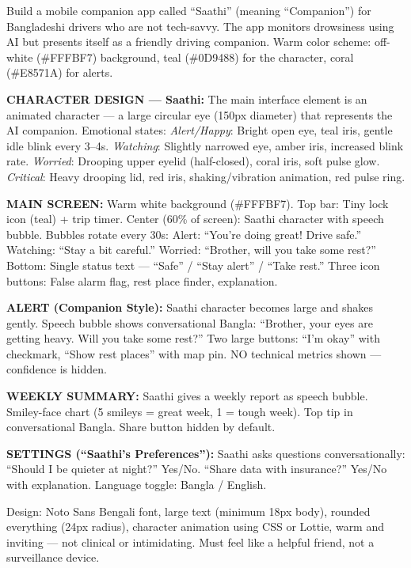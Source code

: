 \documentclass[sigconf]{acmart}
\begin{document}
\begin{promptbox}
Build a mobile companion app called ``Saathi'' (meaning ``Companion'') for Bangladeshi drivers who are not tech-savvy. The app monitors drowsiness using AI but presents itself as a friendly driving companion. Warm color scheme: off-white (\#FFFBF7) background, teal (\#0D9488) for the character, coral (\#E8571A) for alerts.

\textbf{CHARACTER DESIGN --- Saathi:} The main interface element is an animated character --- a large circular eye (150px diameter) that represents the AI companion. Emotional states: \textit{Alert/Happy}: Bright open eye, teal iris, gentle idle blink every 3--4s. \textit{Watching}: Slightly narrowed eye, amber iris, increased blink rate. \textit{Worried}: Drooping upper eyelid (half-closed), coral iris, soft pulse glow. \textit{Critical}: Heavy drooping lid, red iris, shaking/vibration animation, red pulse ring.

\textbf{MAIN SCREEN:} Warm white background (\#FFFBF7). Top bar: Tiny lock icon (teal) + trip timer. Center (60\% of screen): Saathi character with speech bubble. Bubbles rotate every 30s: Alert: ``You're doing great! Drive safe.'' Watching: ``Stay a bit careful.'' Worried: ``Brother, will you take some rest?'' Bottom: Single status text --- ``Safe'' / ``Stay alert'' / ``Take rest.'' Three icon buttons: False alarm flag, rest place finder, explanation.

\textbf{ALERT (Companion Style):} Saathi character becomes large and shakes gently. Speech bubble shows conversational Bangla: ``Brother, your eyes are getting heavy. Will you take some rest?'' Two large buttons: ``I'm okay'' with checkmark, ``Show rest places'' with map pin. NO technical metrics shown --- confidence is hidden.

\textbf{WEEKLY SUMMARY:} Saathi gives a weekly report as speech bubble. Smiley-face chart (5 smileys = great week, 1 = tough week). Top tip in conversational Bangla. Share button hidden by default.

\textbf{SETTINGS (``Saathi's Preferences''):} Saathi asks questions conversationally: ``Should I be quieter at night?'' Yes/No. ``Share data with insurance?'' Yes/No with explanation. Language toggle: Bangla / English.

Design: Noto Sans Bengali font, large text (minimum 18px body), rounded everything (24px radius), character animation using CSS or Lottie, warm and inviting --- not clinical or intimidating. Must feel like a helpful friend, not a surveillance device.
\end{promptbox}
\end{document}
